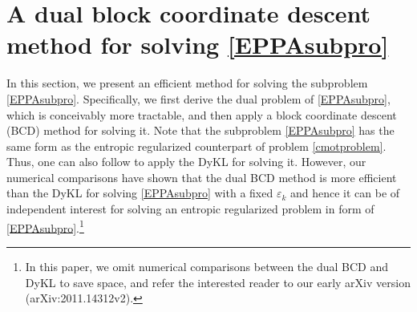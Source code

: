 \documentclass[10pt]{article}
\newcommand{\blue}[1]{\begin{color}{blue}#1\end{color}}
\begin{document}





\section{A dual block coordinate descent method for solving \eqref{EPPAsubpro}}\label{secBCD}

In this section, we present an efficient method for solving the subproblem \eqref{EPPAsubpro}. Specifically, we first derive the dual problem of \eqref{EPPAsubpro}, which is conceivably more tractable, and then apply a block coordinate descent (BCD) method for solving it. Note that the subproblem \eqref{EPPAsubpro} has the same form as the entropic regularized counterpart of problem \eqref{cmotproblem}. Thus, one can also follow \cite{bccnp2015iterative} to apply the DyKL for solving it. However, our numerical comparisons have shown that the dual BCD method is more efficient than the DyKL for solving \eqref{EPPAsubpro} with a fixed $\varepsilon_k$ and hence it can be of independent interest for solving an entropic regularized problem in form of \eqref{EPPAsubpro}.\footnote{In this paper, we omit numerical comparisons between the dual BCD and DyKL to save space, and refer the interested reader to our early arXiv version (arXiv:2011.14312v2).}
\end{document}
